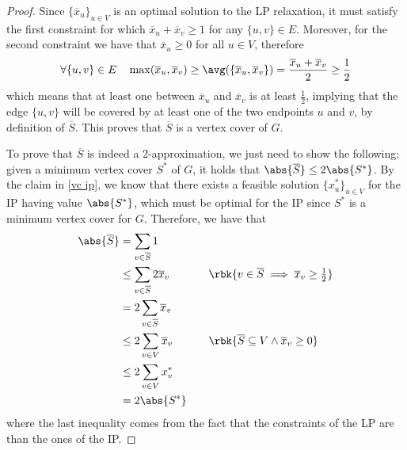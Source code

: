 \documentclass[a4paper, 12pt]{report}
\begin{document}
    \begin{proof}
        Since $\{\overline x_u\}_{u \in V}$ is an optimal solution to the LP relaxation, it must satisfy the first constraint for which $\overline x_u + \overline x_v \ge 1$ for any $\{u, v\} \in E$. Moreover, for the second constraint we have that $\overline x_u \ge 0$ for all $u \in V$, therefore $$\forall \{u, v\} \in E \quad \max(\overline x_u, \overline x_v) \ge \avg(\{\overline x_u, \overline x_v\}) = \dfrac{\overline x_u + \overline x_v}{2} \ge \dfrac{1}{2}$$ which means that at least one between $\overline x_u$ and $\overline x_v$ is at least $\frac{1}{2}$, implying that the edge $\{u, v\}$ will be covered by at least one of the two endpoints $u$ and $v$, by definition of $\overline S$. This proves that $\overline S$ is a vertex cover of $G$.

        To prove that $\overline S$ is indeed a 2-approximation, we just need to show the following: given a minimum vertex cover $S^*$ of $G$, it holds that $\abs{\overline S} \le 2 \abs{S^*}$. By the claim in \cref{vc ip}, we know that there exists a feasible solution $\{x^*_u\}_{u \in V}$ for the IP having value $\abs{S^*}$, which must be optimal for the IP since $S^*$ is a minimum vertex cover for $G$. Therefore, we have that
            \begin{equation*}
                \begin{alignedat}{2}
                    \abs{\overline S} &= \sum_{v \in \overline S}{1} && \\
                                      &\le \sum_{v \in \overline S}{2 \overline x_v} && \quad \quad \rbk{v \in \overline S \implies \overline x_v \ge \tfrac{1}{2}}\\
                                      &= 2 \sum_{v \in \overline S}{\overline x_v} && \\
                                      &\le 2 \sum_{v \in V}{\overline x_v} && \quad \quad \rbk{\overline S \subseteq V \land \overline x_v \ge 0} \\
                                      &\le 2 \sum_{v \in V}{x^*_v} && \\
                                      &= 2 \abs{S^*} &&\\
                \end{alignedat}
            \end{equation*}
            where the last inequality comes from the fact that the constraints of the LP are  than the ones of the IP.
    \end{proof}
\end{document}
